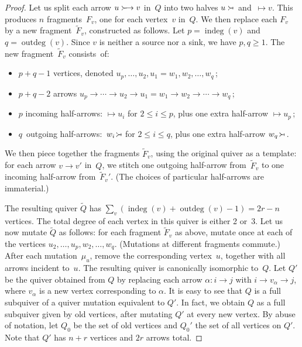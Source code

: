 \documentclass[ALCO,ThmDefs,Unicode,epreuves,published]{cedram}
\DeclareMathOperator{\indeg}{indeg}
\DeclareMathOperator{\outdeg}{outdeg}
\newcommand{\lefthalfarrow}{\succ\hspace{-2pt}\mapstochar}
\begin{document}
\begin{proof}
Let us split each arrow $u \mathrel{\succ\hspace{-2pt}\rightarrow} v$ in~$Q$ into two halves 
$u\lefthalfarrow{}$ and~${}\mapsto v$. This produces $n$ fragments~$F_v$, one for each vertex~$v$ in~$Q$. We then replace each $F_v$ by a new fragment~$\widetilde F_v$, constructed as follows. Let $p=\indeg (v)$ and $q=\outdeg(v)$. Since $v$ is neither a source nor a sink, we have $p,q\ge 1$. 
The new fragment~$\widetilde F_v$ consists~of: 
\begin{itemize} %
\item
$p+q-1$ vertices, denoted 
$u_{p},\dots,u_2,u_1=w_1,w_2,\dots,w_{q}\,$;
\item
$p+q-2$ arrows $u_{p}\longrightarrow \cdots \longrightarrow u_2\longrightarrow u_1=w_1\longrightarrow w_2 \longrightarrow\cdots\longrightarrow w_{q}\,$;
\item 
$p$ incoming half-arrows: $\mapsto \!u_i$ for $2\le i\le p$, plus one extra half-arrow $\mapsto \!u_{p}\,$;
\item
$q$~outgoing half-arrows: $\,w_i\!\lefthalfarrow\,$ for $2\le i\le q$, plus one extra half-arrow $w_q\!\lefthalfarrow\,\,$. 
\end{itemize}
We then piece together the fragments $\widetilde F_v$, using the original quiver as a template: for each arrow $v\longrightarrow v'$ in~$Q$, we stitch one outgoing half-arrow from~$\widetilde F_v$ to one incoming half-arrow from~$\widetilde F_v'$. (The choices of particular half-arrows are immaterial.) 

The resulting quiver $\widetilde Q$ has 
$\sum_v (\indeg(v)+\outdeg(v)-1)=2r-n$ vertices. 
The total degree of each vertex in this quiver is either 2 or~3. 
Let us now mutate $\widetilde Q$ as follows: for each fragment $\widetilde F_v$ as above, mutate once at each of the vertices $u_2,\dots,u_{p},w_2,\dots,w_q$. (Mutations at different fragments commute.) 
After each mutation~$\mu_u$, remove the corresponding vertex~$u$, together with all arrows incident to~$u$. The resulting quiver is canonically isomorphic to~$Q$. 
%
\iffalse
Let $Q'$ be the quiver obtained from $Q$ by replacing each arrow $\alpha:i\longrightarrow j$ with $i\longrightarrow v_\alpha \longrightarrow j$, where $v_\alpha$ is a new vertex corresponding to $\alpha$. It is easy to see that $Q$ is a full subquiver of a quiver mutation equivalent to $Q'$. In fact, we obtain $Q$ as a full subquiver given by old vertices, after mutating $Q'$ at every new vertex. By abuse of notation, let $Q_0$ be the set of old vertices and $Q_0'$ the set of all vertices on $Q'$. Note that $Q'$ has $n+r$ vertices and $2r$ arrows total.


\end{proof}
\end{document}
